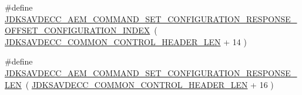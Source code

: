 \begin{DoxyCompactItemize}
\item 
\#define \hyperlink{group__command__set__configuration__response_gaae68ce83949da305879810d71ae55dca}{J\+D\+K\+S\+A\+V\+D\+E\+C\+C\+\_\+\+A\+E\+M\+\_\+\+C\+O\+M\+M\+A\+N\+D\+\_\+\+S\+E\+T\+\_\+\+C\+O\+N\+F\+I\+G\+U\+R\+A\+T\+I\+O\+N\+\_\+\+R\+E\+S\+P\+O\+N\+S\+E\+\_\+\+O\+F\+F\+S\+E\+T\+\_\+\+C\+O\+N\+F\+I\+G\+U\+R\+A\+T\+I\+O\+N\+\_\+\+I\+N\+D\+EX}~( \hyperlink{group__jdksavdecc__avtp__common__control__header_gaae84052886fb1bb42f3bc5f85b741dff}{J\+D\+K\+S\+A\+V\+D\+E\+C\+C\+\_\+\+C\+O\+M\+M\+O\+N\+\_\+\+C\+O\+N\+T\+R\+O\+L\+\_\+\+H\+E\+A\+D\+E\+R\+\_\+\+L\+EN} + 14 )
\item 
\#define \hyperlink{group__command__set__configuration__response_gabfda3489bac29dd70f22df45614e6824}{J\+D\+K\+S\+A\+V\+D\+E\+C\+C\+\_\+\+A\+E\+M\+\_\+\+C\+O\+M\+M\+A\+N\+D\+\_\+\+S\+E\+T\+\_\+\+C\+O\+N\+F\+I\+G\+U\+R\+A\+T\+I\+O\+N\+\_\+\+R\+E\+S\+P\+O\+N\+S\+E\+\_\+\+L\+EN}~( \hyperlink{group__jdksavdecc__avtp__common__control__header_gaae84052886fb1bb42f3bc5f85b741dff}{J\+D\+K\+S\+A\+V\+D\+E\+C\+C\+\_\+\+C\+O\+M\+M\+O\+N\+\_\+\+C\+O\+N\+T\+R\+O\+L\+\_\+\+H\+E\+A\+D\+E\+R\+\_\+\+L\+EN} + 16 )
\end{DoxyCompactItemize}
